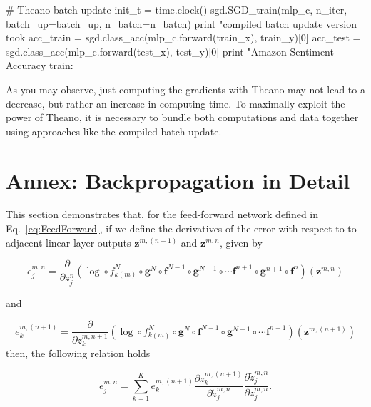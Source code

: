 \begin{exercise}
\begin{python}
# Theano batch update
init_t = time.clock()
sgd.SGD_train(mlp_c, n_iter, batch_up=batch_up, n_batch=n_batch)
print "\nTheano compiled batch update version took %
acc_train = sgd.class_acc(mlp_c.forward(train_x), train_y)[0]
acc_test  = sgd.class_acc(mlp_c.forward(test_x), test_y)[0]
print "Amazon Sentiment Accuracy train: %
\end{python}
As you may observe, just computing the gradients with Theano may not lead to
a decrease, but rather an increase in computing time. To maximally exploit
the power of Theano, it is necessary to bundle both computations and data 
together using approaches like the compiled batch update.
\end{exercise}

\section*{Annex: Backpropagation in Detail}

This section demonstrates that, for the feed-forward
network defined in Eq.~\ref{eq:FeedForward}, if we define the derivatives of
the error with respect to to adjacent linear layer outputs
$\mathbf{z}^{m,(n+1)}$ and $\mathbf{z}^{m,n}$, given by

\begin{equation}
e^{m,n}_j = \frac{\partial}{\partial z^{n}_{j}} (\log \circ f_{k(m)}^N \circ \mathbf{g}^N \circ \mathbf{f}^{N-1} \circ \mathbf{g}^{N-1} \circ \cdots \mathbf{f}^{n+1} \circ \mathbf{g}^{n+1} \circ \mathbf{f}^{n})(\mathbf{z}^{m,n}) 
\label{eq:endetail}
\end{equation}

\noindent and 

\begin{equation}
e^{m,(n+1)}_k = \frac{\partial}{\partial z^{m,n+1}_{k}} (\log \circ f_{k(m)}^N \circ \mathbf{g}^N \circ \mathbf{f}^{N-1} \circ \mathbf{g}^{N-1} \circ \cdots \mathbf{f}^{n+1})(\mathbf{z}^{m,(n+1)})
\label{eq:enp1detail}
\end{equation}
%
\noindent then,
 the following relation holds

\begin{equation}
e^{m,n}_j = \sum_{k=1}^K e^{m,(n+1)}_k \frac{\partial z^{m,(n+1)}_k}{\partial \tilde{z}_{j}^{m,n}}\frac{\partial \tilde{z}^{m,n}_{j}}{\partial z_{j}^{m,n}}.
\label{eq:DetailchainRulRecursion}
\end{equation}

